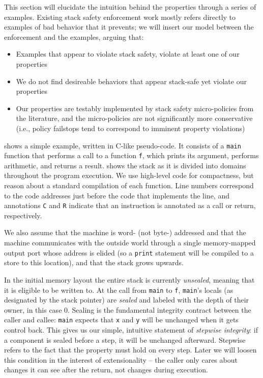 This section will elucidate the intuition behind the properties through a series
of examples. Existing stack safety enforcement work mostly refers directly to examples
of bad behavior that it prevents; we will insert our model between the enforcement and
the examples, arguing that:

\begin{itemize}
\item Examples that appear to violate stack safety, violate at least one of our properties
\item We do not find desireable behaviors that appear stack-safe yet violate our properties
\item Our properties are testably implemented by stack safety micro-policies from the literature,
  and the micro-policies are not significantly more conservative (i.e., policy failstops tend to
  correspond to imminent property violations)
\end{itemize}

 shows a simple example, written in C-like pseudo-code.
It consists of a {\tt main} function that performs a call to a function {\tt f},
which prints its argument, performs arithmetic, and returns a result.
 shows the stack as it is divided into domains throughout
the program execution. We use high-level code for compactness, but reason about
a standard compilation of each function. Line numbers correspond to the code
addresses just before the code that implements the line, and annotations
{\tt C} and {\tt R} indicate that an instruction is annotated as a call or
return, respectively.

We also assume that the machine is word- (not byte-) addressed and that the
machine communicates with the outside world through a single memory-mapped
output port whose address is elided (so a {\tt print} statement will be
compiled to a store to this location), and that the stack grows upwards.

In the initial memory layout the entire stack is currently {\em unsealed},
meaning that it is eligible to be written to. At the call from {\tt main} to
{\tt f}, {\tt main}'s locals (as designated by the stack pointer) are
{\em sealed} and labeled with the depth of their owner, in this case 0.
Sealing is the fundamental integrity contract between the caller and callee:
{\tt main} expects that {\tt x} and {\tt y} will be unchanged when it gets control back.
This gives us our simple, intuitive statement of {\em stepwise integrity}:
if a component is sealed before a step, it will be unchanged afterward. Stepwise
refers to the fact that the property must hold on every step. Later we will
loosen this condition in the interest of extensionality -- the caller only
cares about changes it can see after the return, not changes during execution.

